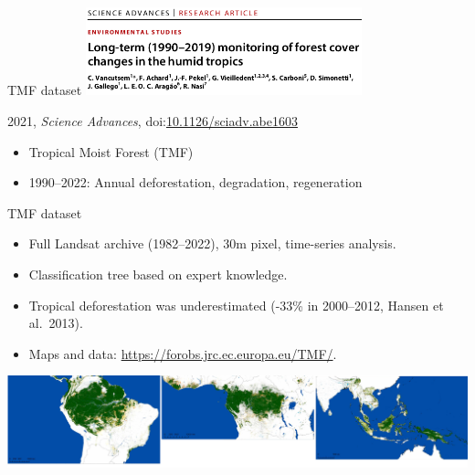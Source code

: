 \documentclass[10pt,table,dvipsnames,compress]{beamer}
\begin{document}
\begin{frame}[label={sec:org99fd0be}]{TMF dataset}
\centering \includegraphics[width=8cm]{figs/Vancutsem2021}

 2021, \emph{Science Advances}, doi:\href{https//doi.org10.1126/sciadv.abe1603}{10.1126/sciadv.abe1603}

\begin{itemize}
\item Tropical Moist Forest (TMF)
\item 1990--2022: Annual deforestation, degradation, regeneration
\end{itemize}
\end{frame}

\begin{frame}[label={sec:org968ebfa}]{TMF dataset}
\begin{itemize}
\item Full Landsat archive (1982--2022), 30m pixel, time-series analysis.
\item Classification tree based on expert knowledge.
\item Tropical deforestation was underestimated (-33\% in 2000--2012, Hansen
et al. 2013).
\item Maps and data: \url{https://forobs.jrc.ec.europa.eu/TMF/}.
\end{itemize}

\vspace{0.25cm}
\centering \includegraphics[width=\textwidth]{figs/Vancutsem2021-maps-wide}
\end{frame}
\end{document}
